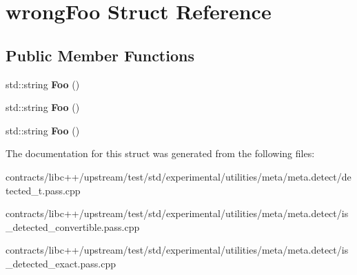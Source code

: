 \hypertarget{structwrong_foo}{}\section{wrong\+Foo Struct Reference}
\label{structwrong_foo}
\subsection*{Public Member Functions}
\begin{DoxyCompactItemize}
\item 
\mbox{\label{structwrong_foo_a481a7431ce790cdd14a7074c2ece52ba}} 
std\+::string {\bfseries Foo} ()
\item 
\mbox{\label{structwrong_foo_a481a7431ce790cdd14a7074c2ece52ba}} 
std\+::string {\bfseries Foo} ()
\item 
\mbox{\label{structwrong_foo_a481a7431ce790cdd14a7074c2ece52ba}} 
std\+::string {\bfseries Foo} ()
\end{DoxyCompactItemize}


The documentation for this struct was generated from the following files\+:\begin{DoxyCompactItemize}
\item 
contracts/libc++/upstream/test/std/experimental/utilities/meta/meta.\+detect/detected\+\_\+t.\+pass.\+cpp\item 
contracts/libc++/upstream/test/std/experimental/utilities/meta/meta.\+detect/is\+\_\+detected\+\_\+convertible.\+pass.\+cpp\item 
contracts/libc++/upstream/test/std/experimental/utilities/meta/meta.\+detect/is\+\_\+detected\+\_\+exact.\+pass.\+cpp\end{DoxyCompactItemize}
